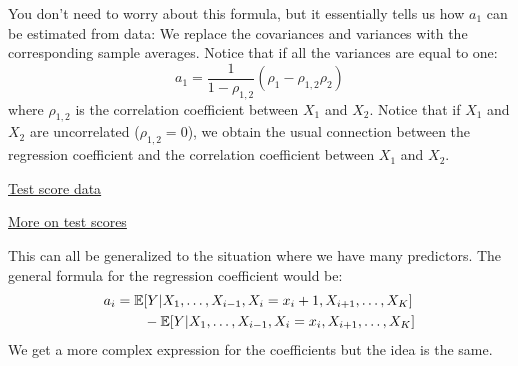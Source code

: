 You don't need to worry about this formula, but it essentially tells us how $a_1$ can be estimated from data: We replace the covariances and variances with the corresponding sample averages.  Notice that if all the variances are equal to one: 
\begin{equation}
a_1 = \frac{1}{1-\rho_{1,2}}(\rho_1 - \rho_{1,2}\rho_2)
\end{equation}
where $\rho_{1,2}$ is the correlation coefficient between $X_1$ and $X_2$. Notice that if $X_1$ and $X_2$ are uncorrelated ($\rho_{1,2}=0$), we obtain the usual connection between the regression coefficient and the correlation coefficient between $X_1$ and $X_2$. 
%
%
%

\begin{exercise}
\href{https://colab.research.google.com/drive/1oIRgP_7-c5DGV1D2iz5nj406mZfJxUIG#scrollTo=wbeO1TS8os5J&line=15&uniqifier=1}{Test score data}
\end{exercise}


\begin{exercise}
\href{https://colab.research.google.com/drive/1oIRgP_7-c5DGV1D2iz5nj406mZfJxUIG#scrollTo=wbeO1TS8os5J&line=15&uniqifier=1}{More on test scores}
\end{exercise}


This can all be generalized to the situation where we have many predictors. The general formula for the regression coefficient would be: 
\begin{align}
\begin{split}
a_i &= \mathbb E[Y|X_1,\dots,X_{i-1},X_i=x_i+1,X_{i+1},\dots,X_K]\\
&\quad\quad - \mathbb E[Y|X_1,\dots,X_{i-1},X_i=x_i,X_{i+1},\dots,X_K]
\end{split}
\end{align}
We get a more complex expression for the coefficients but the idea is the same. 



